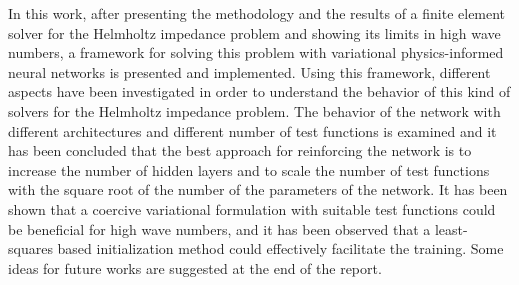In this work, after presenting the methodology and the results of a finite element solver for the Helmholtz impedance problem and showing its limits in high wave numbers, a framework for solving this problem with variational physics-informed neural networks is presented and implemented. Using this framework, different aspects have been investigated in order to understand the behavior of this kind of solvers for the Helmholtz impedance problem. The behavior of the network with different architectures and different number of test functions is examined and it has been concluded that the best approach for reinforcing the network is to increase the number of hidden layers and to scale the number of test functions with the square root of the number of the parameters of the network. It has been shown that a coercive variational formulation with suitable test functions could be beneficial for high wave numbers, and it has been observed that a least-squares based initialization method could effectively facilitate the training. Some ideas for future works are suggested at the end of the report.
